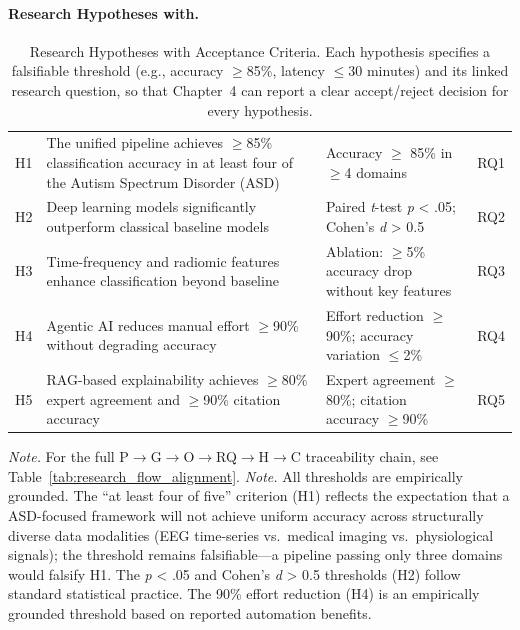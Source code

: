 \paragraph{Research Hypotheses with.}




{\tablestripes\tablefontsize
{}
\begin{xltabular}{\textwidth}{@{} >{\raggedright\arraybackslash}p{0.5cm} L L >{\raggedright\arraybackslash}p{0.8cm} @{}}
\caption[Research Hypotheses with Acceptance Criteria]{Research Hypotheses with Acceptance Criteria. Each hypothesis specifies a falsifiable threshold (e.g., accuracy $\geq$85\%, latency $\leq$30 minutes) and its linked research question, so that Chapter~4 can report a clear accept/reject decision for every hypothesis.}\label{tab:hypotheses} \\
\toprule
{} &  &  &  \\
\midrule
\endfirsthead
\endhead
\bottomrule
\endlastfoot
H1 & The unified pipeline achieves $\geq$85\% classification accuracy in at least four of the Autism Spectrum Disorder (ASD) & Accuracy $\geq$ 85\% in $\geq$4 domains & RQ1 \\
\addlinespace
H2 & Deep learning models significantly outperform classical baseline models & Paired \textit{t}-test \textit{p} < .05; Cohen's \textit{d} > 0.5 & RQ2 \\
\addlinespace
H3 & Time-frequency and radiomic features enhance classification beyond baseline & Ablation: $\geq$5\% accuracy drop without key features & RQ3 \\
\addlinespace
H4 & Agentic AI reduces manual effort $\geq$90\% without degrading accuracy & Effort reduction $\geq$90\%; accuracy variation $\leq$2\% & RQ4 \\
\addlinespace
H5 & RAG-based explainability achieves $\geq$80\% expert agreement and $\geq$90\% citation accuracy & Expert agreement $\geq$80\%; citation accuracy $\geq$90\% & RQ5 \\
\end{xltabular}}
\vspace{0.5em}
\noindent\textit{Note.} For the full P$\to$G$\to$O$\to$RQ$\to$H$\to$C traceability chain, see Table~\ref{tab:research_flow_alignment}.
\noindent\textit{Note.} All thresholds are empirically grounded. The ``at least four of five'' criterion (H1) reflects the expectation that a ASD-focused framework will not achieve uniform accuracy across structurally diverse data modalities (EEG time-series vs.\ medical imaging vs.\ physiological signals); the threshold remains falsifiable---a pipeline passing only three domains would falsify H1. The \textit{p} < .05 and Cohen's \textit{d} > 0.5 thresholds (H2) follow standard statistical practice. The 90\% effort reduction (H4) is an empirically grounded threshold based on reported automation benefits.


